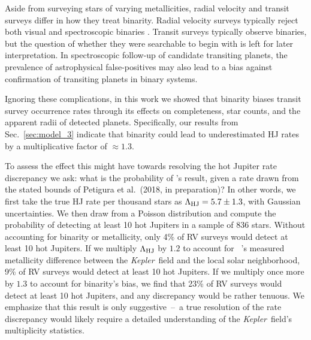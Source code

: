 Aside from surveying stars of varying metallicities, radial velocity and 
transit surveys differ in how they treat binarity.
Radial velocity surveys typically reject both visual and spectroscopic binaries
\citep[\textit{e.g.},][]{wright_frequency_2012}.
Transit surveys typically observe binaries, but the question of whether they 
were searchable to begin with is left for later interpretation.
In spectroscopic follow-up of candidate transiting planets, the prevalence of 
astrophysical false-positives may also lead to a bias against confirmation of 
transiting planets in binary systems.

Ignoring these complications, in this work we showed that
binarity biases transit survey occurrence rates through its effects on 
completeness, star counts, and the apparent radii of detected planets.
Specifically, our results from Sec.~\ref{sec:model_3} indicate that binarity 
could lead to underestimated HJ rates by a multiplicative factor of $\approx 
1.3$.

To assess the effect this might have towards resolving the hot Jupiter rate 
discrepancy we ask:
what is the probability of \citet{wright_frequency_2012}'s result, given a 
rate drawn from the stated bounds of Petigura et al.~(2018, in preparation)?
In other words, we first take the true HJ rate per thousand stars as 
$\Lambda_{\rm HJ} = 5.7 \pm 1.3$, with Gaussian uncertainties. 
We then draw from a Poisson distribution and compute the probability of 
detecting at least 10 hot Jupiters in a sample of 836 stars.
Without accounting for binarity or metallicity, only 4\% of RV surveys would 
detect at least 10 hot Jupiters.
If we multiply $\Lambda_{\rm HJ}$ by $1.2$ to account for 
~\citet{guo_metallicity_2017}'s measured metallicity difference between the 
{\it Kepler}\ field and the local solar neighborhood, 9\% of RV surveys would 
detect at least 10 hot Jupiters.
If we multiply once more by $1.3$ to account for binarity's bias, we find that
23\% of RV surveys would detect at least 10 hot Jupiters, and any discrepancy 
would be rather tenuous.
We emphasize that this result is only suggestive~--~a true resolution of the 
rate discrepancy would likely require a detailed understanding of the {\it 
Kepler}\ field's multiplicity statistics.


